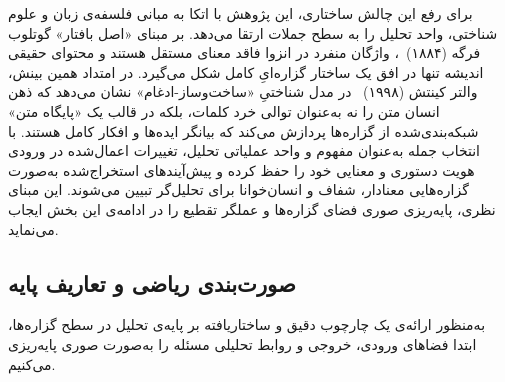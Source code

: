 برای رفع این چالش ساختاری، این پژوهش با اتکا به مبانی فلسفه‌ی زبان و علوم شناختی، واحد تحلیل را به سطح جملات ارتقا می‌دهد. بر مبنای «اصل بافتار» گوتلوب فرگه (۱۸۸۴)~\cite{frege1991foundations}، واژگان منفرد در انزوا فاقد معنای مستقل هستند و محتوای حقیقی اندیشه تنها در افق یک ساختار گزاره‌ایِ کامل شکل می‌گیرد. در امتداد همین بینش، والتر کینتش (۱۹۹۸)~\cite{kintsch1998comprehension} در مدل شناختیِ «ساخت‌وساز-ادغام» نشان می‌دهد که ذهن انسان متن را نه به‌عنوان توالی خرد کلمات، بلکه در قالب یک «پایگاه متن» شبکه‌بندی‌شده از گزاره‌ها پردازش می‌کند که بیانگر ایده‌ها و افکار کامل هستند. با انتخاب جمله به‌عنوان مفهوم و واحد عملیاتی تحلیل، تغییرات اعمال‌شده در ورودی هویت دستوری و معنایی خود را حفظ کرده و پیش‌آیندهای استخراج‌شده به‌صورت گزاره‌هایی معنادار، شفاف و انسان‌خوانا برای تحلیل‌گر تبیین می‌شوند. این مبنای نظری، پایه‌ریزی صوری فضای گزاره‌ها و عملگر تقطیع را در ادامه‌ی این بخش ایجاب می‌نماید.


\subsection{صورت‌بندی ریاضی و تعاریف پایه}\label{sec:1-1-1}

به‌منظور ارائه‌ی یک چارچوب دقیق و ساختاریافته بر پایه‌ی تحلیل در سطح گزاره‌ها، ابتدا فضاهای ورودی، خروجی و روابط تحلیلی مسئله را به‌صورت صوری پایه‌ریزی می‌کنیم.

